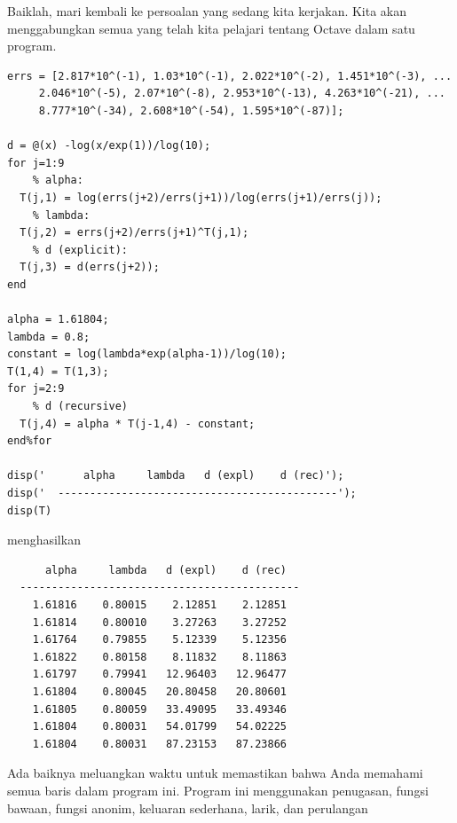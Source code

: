 \noindent Baiklah, mari kembali ke persoalan yang sedang kita kerjakan.
Kita akan menggabungkan semua yang telah kita pelajari tentang Octave
dalam satu program. \begin{verbatim}
errs = [2.817*10^(-1), 1.03*10^(-1), 2.022*10^(-2), 1.451*10^(-3), ...
     2.046*10^(-5), 2.07*10^(-8), 2.953*10^(-13), 4.263*10^(-21), ...
     8.777*10^(-34), 2.608*10^(-54), 1.595*10^(-87)];

d = @(x) -log(x/exp(1))/log(10);
for j=1:9
    % alpha:
  T(j,1) = log(errs(j+2)/errs(j+1))/log(errs(j+1)/errs(j));
    % lambda:
  T(j,2) = errs(j+2)/errs(j+1)^T(j,1);
    % d (explicit):
  T(j,3) = d(errs(j+2));
end

alpha = 1.61804;
lambda = 0.8;
constant = log(lambda*exp(alpha-1))/log(10);
T(1,4) = T(1,3);
for j=2:9
    % d (recursive)
  T(j,4) = alpha * T(j-1,4) - constant;
end%for

disp('      alpha     lambda   d (expl)    d (rec)');
disp('  --------------------------------------------');
disp(T) 
\end{verbatim} menghasilkan \begin{verbatim}
      alpha     lambda   d (expl)    d (rec)
  --------------------------------------------
    1.61816    0.80015    2.12851    2.12851
    1.61814    0.80010    3.27263    3.27252
    1.61764    0.79855    5.12339    5.12356
    1.61822    0.80158    8.11832    8.11863
    1.61797    0.79941   12.96403   12.96477
    1.61804    0.80045   20.80458   20.80601
    1.61805    0.80059   33.49095   33.49346
    1.61804    0.80031   54.01799   54.02225
    1.61804    0.80031   87.23153   87.23866 
\end{verbatim}Ada baiknya meluangkan waktu untuk memastikan bahwa Anda memahami
semua baris dalam program ini. Program ini menggunakan penugasan,
fungsi bawaan, fungsi anonim, keluaran sederhana, larik, dan perulangan
